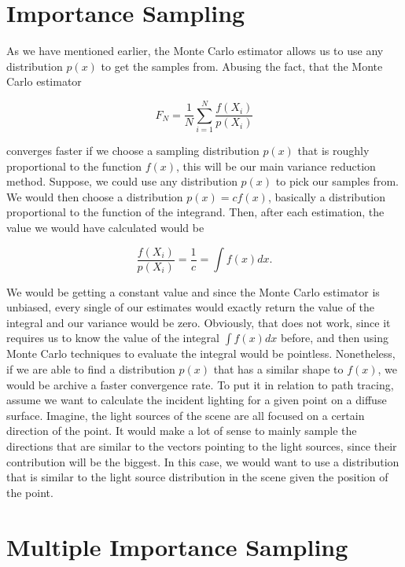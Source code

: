 \section{Importance Sampling}
\label{ch:preliminaries:is}

As we have mentioned earlier, the Monte Carlo estimator allows us to use any distribution $p(x)$ to get the samples from. Abusing the fact, that the Monte Carlo estimator 

\begin{equation}
F_N = \frac{1}{N}\sum_{i = 1}^{N}\frac{f(X_i)}{p(X_i)}
\end{equation}

converges faster if we choose a sampling distribution $p(x)$ that is roughly proportional to the function $f(x)$, this will be our main variance reduction method. Suppose, we could use any distribution $p(x)$ to pick our samples from. We would then choose a distribution $p(x) = cf(x)$, basically a distribution proportional to the function of the integrand. Then, after each estimation, the value we would have calculated would be 

\begin{equation}
\frac{f(X_i)}{p(X_i)} = \frac{1}{c} = \int{f(x)dx}.
\end{equation}

We would be getting a constant value and since the Monte Carlo estimator is unbiased, every single of our estimates would exactly return the value of the integral and our variance would be zero. Obviously, that does not work, since it requires us to know the value of the integral $\int{f(x)dx}$ before, and then using Monte Carlo techniques to evaluate the integral would be pointless. Nonetheless, if we are able to find a distribution $p(x)$ that has a similar shape to $f(x)$, we would be archive a faster convergence rate. To put it in relation to path tracing, assume we want to calculate the incident lighting for a given point on a diffuse surface. Imagine, the light sources of the scene are all focused on a certain direction of the point. It would make a lot of sense to mainly sample the directions that are similar to the vectors pointing to the light sources, since their contribution will be the biggest. In this case, we would want to use a distribution that is similar to the light source distribution in the scene given the position of the point.

\section{Multiple Importance Sampling}
\label{ch:preliminaries:mis}


